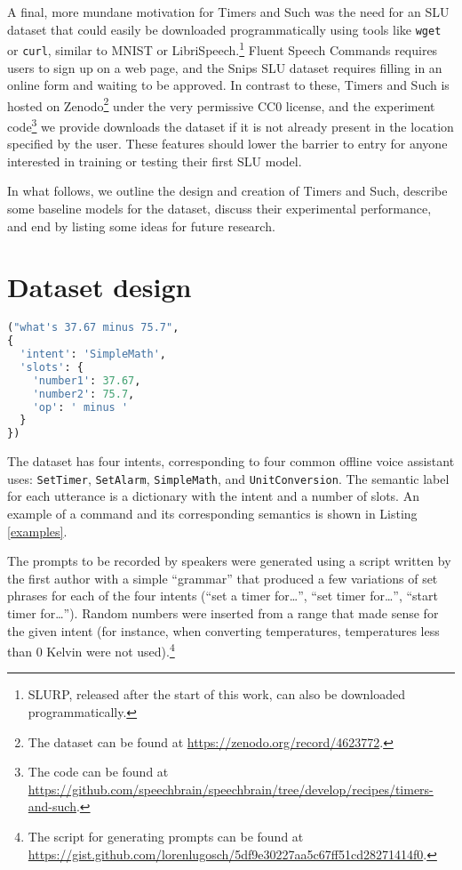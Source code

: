 \documentclass{article}
\begin{document}
A final, more mundane motivation for Timers and Such was the need for an SLU dataset that could easily be downloaded programmatically using tools like \texttt{wget} or \texttt{curl}, similar to MNIST or LibriSpeech.\footnote{SLURP, released after the start of this work, can also be downloaded programmatically.} Fluent Speech Commands requires users to sign up on a web page, and the Snips SLU dataset requires filling in an online form and waiting to be approved. In contrast to these, Timers and Such is hosted on Zenodo\footnote{The dataset can be found at \url{https://zenodo.org/record/4623772}.} under the very permissive CC0 license, and the experiment code\footnote{The code can be found at \url{https://github.com/speechbrain/speechbrain/tree/develop/recipes/timers-and-such}.} we provide downloads the dataset if it is not already present in the location specified by the user. These features should lower the barrier to entry for anyone interested in training or testing their first SLU model.

In what follows, we outline the design and creation of Timers and Such, describe some baseline models for the dataset, discuss their experimental performance, and end by listing some ideas for future research.

\section{Dataset design}





\begin{lstlisting}[float,language=Python, frame=lines, basicstyle=\footnotesize\ttfamily, caption={A \texttt{SimpleMath} command and its label dictionary.}, label={examples}]
("what's 37.67 minus 75.7",
{
  'intent': 'SimpleMath', 
  'slots': {
    'number1': 37.67, 
    'number2': 75.7, 
    'op': ' minus '
  }
})
\end{lstlisting}

The dataset has four intents, corresponding to four common offline voice assistant uses: \texttt{SetTimer}, \texttt{SetAlarm}, \texttt{SimpleMath}, and \texttt{UnitConversion}. The semantic label for each utterance is a dictionary with the intent and a number of slots. An example of a command and its corresponding semantics is shown in Listing \ref{examples}.

The prompts to be recorded by speakers were generated using a script written by the first author with a simple ``grammar'' that produced a few variations of set phrases for each of the four intents (``set a timer for\dots'', ``set timer for\dots'', ``start timer for\dots'').
Random numbers were inserted from a range that made sense for the given intent (for instance, when converting temperatures, temperatures less than 0 Kelvin were not used).\footnote{The script for generating prompts can be found at \url{https://gist.github.com/lorenlugosch/5df9e30227aa5c67ff51cd28271414f0}.}
\end{document}
